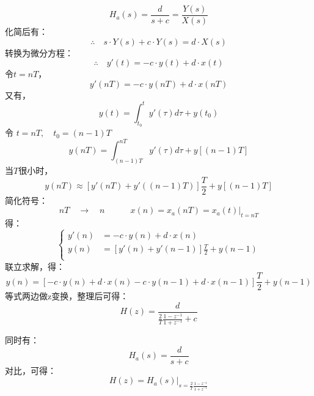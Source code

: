 \documentclass[notheorems,compress,mathserif,table]{beamer}
\begin{document}
\begin{frame}[allowframebreaks]\frametitle{}%
    $$H_a(s) = \frac{d}{s+c}=\frac{Y(s)}{X(s)}$$
    化简后有：
    $$\therefore\quad    s\cdot Y(s)+c\cdot Y(s)=d\cdot X(s)$$
    转换为微分方程：
    $$\therefore\quad    y'(t)= -c\cdot y(t)+ d\cdot x(t)$$
    令$t=nT$，
    $$    y'(nT)= -c\cdot y(nT)+d\cdot x(nT)$$
    又有，
    $$y(t) = \int_{t_0}^{t}y'(\tau)d\tau + y(t_0)$$
    令 $t=nT,\quad t_0 = (n-1)T$
    $$y(nT) = \int_{(n-1)T}^{nT}y'(\tau)d\tau + y\left[(n-1)T\right]$$
    当$T$很小时，
    $$y(nT) \approx \left[y'(nT) +y'((n-1)T)\right]\frac{T}{2} + y[(n-1)T]$$
    简化符号：
    $$nT\quad \rightarrow \quad n   \quad\quad\quad
    x(n) = x_a(nT) = x_a(t)|_{t=nT}$$
    得：
    $$
      \left\{ \begin{aligned}
        y'(n) &= -c\cdot y(n)+d\cdot x(n)\\
        y(n) &= \left[y'(n) +y'(n-1)\right]\frac{T}{2} + y(n-1)\\
      \end{aligned} \right.
    $$
    联立求解，得：
    $$y(n) = \left[-c\cdot y(n)+d\cdot x(n)-c\cdot y(n-1)+d\cdot x(n-1)\right]\frac{T}{2} + y(n-1)$$
    等式两边做z变换，整理后可得：
    $$H(z) = \frac{d}{\frac{2}{T}\frac{1-z^{-1}}{1+z^{-1}}+c}$$

    同时有：
    $$H_a(s) = \frac{d}{s+c}$$
    对比，可得：
    $$H(z) = H_a(s)|_{s=\frac{2}{T}\frac{1-z^{-1}}{1+z^{-1}}}$$

\end{frame}
\end{document}
